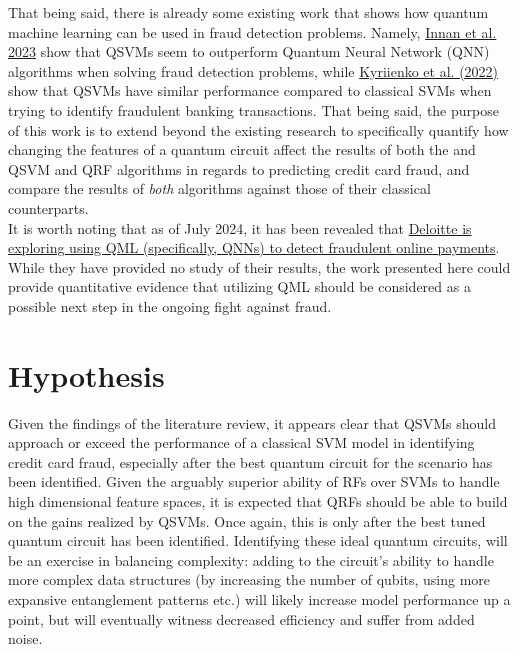 \documentclass[11pt, oneside]{article}   	%
\begin{document}
\noindent\hspace{10mm}That being said, there is already some existing work that shows how quantum machine learning can be used in fraud detection problems. Namely, \href{https://arxiv.org/abs/2308.05237}{Innan et al. 2023} show that QSVMs seem to outperform Quantum Neural Network (QNN) algorithms when solving fraud detection problems, while \href{https://arxiv.org/abs/2208.01203}{Kyriienko et al. (2022)} show that QSVMs have similar performance compared to classical SVMs when trying to identify fraudulent banking transactions. That being said, the purpose of this work is to extend beyond the existing research to specifically quantify how changing the features of a quantum circuit affect the results of both the and QSVM and QRF algorithms in regards to predicting credit card fraud, and compare the results of \textit{both} algorithms against those of their classical counterparts.\\

\noindent\hspace{10mm}It is worth noting that as of July 2024, it has been revealed that \href{https://thequantuminsider.com/2024/07/19/deloitte-italy-explores-quantum-machine-learning-for-digital-payments-fraud-detection/}{Deloitte is exploring using QML (specifically, QNNs) to detect fraudulent online payments}. While they have provided no study of their results, the work presented here could provide quantitative evidence that utilizing QML should be considered as a possible next step in the ongoing fight against fraud. 

\section{Hypothesis}

Given the findings of the literature review, it appears clear that QSVMs should approach or exceed the performance of a classical SVM model in identifying credit card fraud, especially after the best quantum circuit for the scenario has been identified. Given the arguably superior ability of RFs over SVMs to handle high dimensional feature spaces, it is expected that QRFs should be able to build on the gains realized by QSVMs. Once again, this is only after the best tuned quantum circuit has been identified. Identifying these ideal quantum circuits, will be an exercise in balancing complexity: adding to the circuit's ability to handle more complex data structures (by increasing the number of qubits, using more expansive entanglement patterns etc.) will likely increase model performance up a point, but will eventually witness decreased efficiency and suffer from added noise. 
\end{document}
